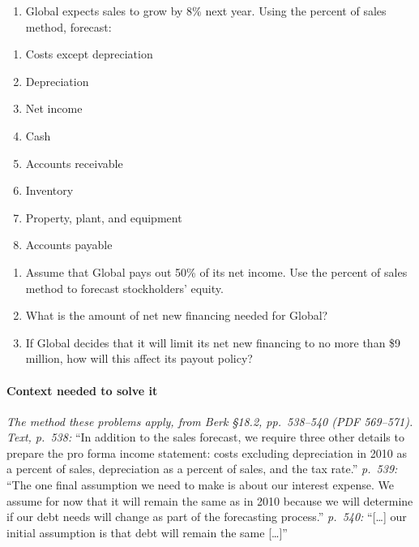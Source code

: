 \documentclass[11pt,a4paper]{article}
\providecommand{\tightlist}{\setlength{\itemsep}{0pt}\setlength{\parskip}{0pt}}
\begin{document}
\begin{enumerate}
\def\labelenumi{\arabic{enumi}.}
\setcounter{enumi}{7}
\tightlist
\item
  Global expects sales to grow by 8\% next year. Using the percent of sales method, forecast:
\end{enumerate}

\begin{enumerate}
\def\labelenumi{\alph{enumi}.}
\item
  Costs except depreciation
\item
  Depreciation
\item
  Net income
\item
  Cash
\item
  Accounts receivable
\item
  Inventory
\item
  Property, plant, and equipment
\item
  Accounts payable
\end{enumerate}

\begin{enumerate}
\def\labelenumi{\arabic{enumi}.}
\setcounter{enumi}{8}
\item
  Assume that Global pays out 50\% of its net income. Use the percent of sales method to forecast
  stockholders' equity.
\item
  What is the amount of net new financing needed for Global?
\item
  If Global decides that it will limit its net new financing to no more than \$9 million, how will
  this affect its payout policy?
\end{enumerate}

\paragraph{Context needed to solve it}

\emph{The method these problems apply, from Berk §18.2, pp.~538--540 (PDF 569--571). Text, p.~538:}
``In addition to the sales forecast, we require three other details to prepare the pro forma income
statement: costs excluding depreciation in 2010 as a percent of sales, depreciation as a percent of
sales, and the tax rate.'' \emph{p.~539:} ``The one final assumption we need to make is about our
interest expense. We assume for now that it will remain the same as in 2010 because we will
determine if our debt needs will change as part of the forecasting process.'' \emph{p.~540:}
``{[}\ldots{]} our initial assumption is that debt will remain the same {[}\ldots{]}''
\end{document}
